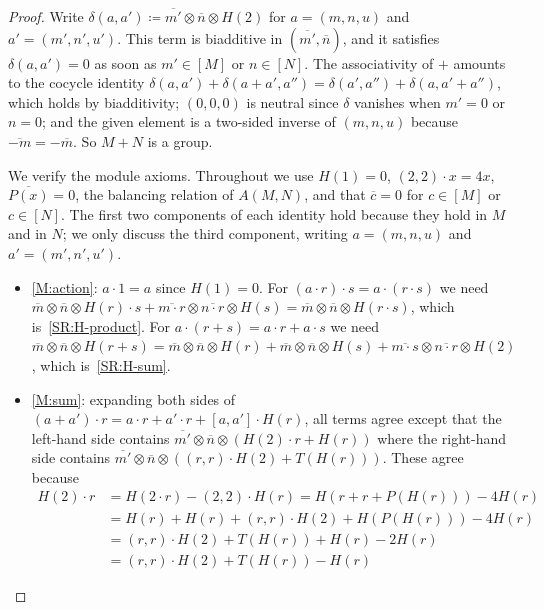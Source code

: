 \documentclass[reqno,a4paper]{amsart}
\theoremstyle{plain}
\theoremstyle{definition}
\newcommand{\DefEq}{\coloneq}
\newcommand{\brk}[2]{\ensuremath{[#1,#2]}}
\begin{document}
\begin{proof}
  Write \(\delta(a,a')\DefEq\overline{m'}\otimes\overline{n}\otimes H(2)\) for \(a=(m,n,u)\) and \(a'=(m',n',u')\). This term is biadditive in \((\overline{m'},\overline{n})\), and it satisfies \(\delta(a,a')=0\) as soon as \(m'\in[M]\) or \(n\in[N]\). The associativity of \(+\) amounts to the cocycle identity \(\delta(a,a')+\delta(a+a',a'')=\delta(a',a'')+\delta(a,a'+a'')\), which holds by biadditivity; \((0,0,0)\) is neutral since \(\delta\) vanishes when \(m'=0\) or \(n=0\); and the given element is a two-sided inverse of \((m,n,u)\) because \(\overline{-m}=-\overline{m}\). So \(M+N\) is a group.

  We verify the module axioms. Throughout we use \(H(1)=0\), \((2,2)\cdot x=4x\), \(\overline{P(x)}=0\), the balancing relation of \(A(M,N)\), and that \(\overline{c}=0\) for \(c\in[M]\) or \(c\in[N]\). The first two components of each identity hold because they hold in \(M\) and in \(N\); we only discuss the third component, writing \(a=(m,n,u)\) and \(a'=(m',n',u')\).
  \begin{itemize}
    \item \ref{M:action}: \(a\cdot 1=a\) since \(H(1)=0\). For \((a\cdot r)\cdot s=a\cdot(r\cdot s)\) we need \(\overline{m}\otimes\overline{n}\otimes H(r)\cdot s+\overline{m\cdot r}\otimes\overline{n\cdot r}\otimes H(s)=\overline{m}\otimes\overline{n}\otimes H(r\cdot s)\), which is~\ref{SR:H-product}. For \(a\cdot(r+s)=a\cdot r+a\cdot s\) we need \(\overline{m}\otimes\overline{n}\otimes H(r+s)=\overline{m}\otimes\overline{n}\otimes H(r)+\overline{m}\otimes\overline{n}\otimes H(s)+\overline{m\cdot s}\otimes\overline{n\cdot r}\otimes H(2)\), which is~\ref{SR:H-sum}.
    \item \ref{M:sum}: expanding both sides of \((a+a')\cdot r=a\cdot r+a'\cdot r+\brk{a}{a'}\cdot H(r)\), all terms agree except that the left-hand side contains \(\overline{m'}\otimes\overline{n}\otimes(H(2)\cdot r+H(r))\) where the right-hand side contains \(\overline{m'}\otimes\overline{n}\otimes((r,r)\cdot H(2)+T(H(r)))\). These agree because
          \begin{align*}
            H(2)\cdot r & =H(2\cdot r)-(2,2)\cdot H(r)=H(r+r+P(H(r)))-4H(r) \\
                        & =H(r)+H(r)+(r,r)\cdot H(2)+H(P(H(r)))-4H(r)       \\
                        & =(r,r)\cdot H(2)+T(H(r))+H(r)-2H(r)               \\
                        & =(r,r)\cdot H(2)+T(H(r))-H(r)

\end{align*}
\end{itemize}
\end{proof}
\end{document}

